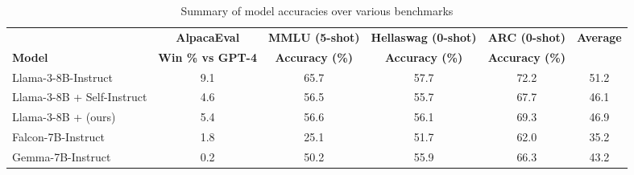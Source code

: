\begin{comment}
Instruciton이 add되면 S로 부터 삭제될 victim seed instruction을 정해야함.
Victim은 해당 seed instruciton이 얼마나 diversity한 generated instruction을 생성했는지에
대한 값, score를 가지고 선정됨.
Score는 seed instruction score table에서 유지되며, 해당 table은 seed instruction이 key로써 작동함.
해당 table의 seed instruction은 seed가 add되면 추가되고, evict되면 table에서 삭제됨.
Score는 다음과 같은 방식으로 매겨짐. 그림 6은 매겨지는 예시를 보여줌.
instruction을 생성할 때, Algorithm 1의 line 1과 같은 방식으로 S'가 선택됨.
예를 들어 seeda, seedb, seedc가 선택되었다고 하자.
이 세 seed instruction을 통해 generation instruction G가 produce됨.
예시에선 14개의 generated instruction이 생성됨.
이때 line 3-13에 의해 filtering이 수행됨. 즉 몇개의 generated instructions가 filtering됨
그림에서는 3개의 generated instruction이 discard되고, 11개의 instruction이 kept됨
한번의 generation 사이클이 모두 끝나고 나면, seed instruction score table을 업데이트 함.
table에서 해당 사이클에 참여한 seeda, seedb, seedc에 대한 seedgen에는 해당
사이클에서 생성된 generated instruction의 수, 14를 더해줌
그리고 seedkept에는 해당 사이클에서 필터링을 통과한 kept instruction의 수 11을 더해줌
해당 값들은 매 사이클마다 누적됨. 다음 사이클에서 seedn, seedm, seedl이 선택되어 instruction generation 과정에 참여했다면
해당 seed instruction의 seedgen, seedkept가 업데이트 될 것임.
마지막으로 score를 업데이트 하는데, score는 seedkept/seedgen으로 계산됨
\end{comment}

\begin{table*}[t]
\caption{Summary of model accuracies over various benchmarks}
\label{tab:benchmarks}
\footnotesize
\centering
\begin{tabular}{l|cccc|c}
                            & \textbf{AlpacaEval}      & \textbf{MMLU (5-shot)} & \textbf{Hellaswag (0-shot)} & \textbf{ARC (0-shot)}   & \textbf{Average} \\ \cline{2-6} 
\textbf{Model}              & \textbf{Win \% vs GPT-4} & \textbf{Accuracy (\%)} & \textbf{Accuracy (\%)}      & \textbf{Accuracy (\%)}  & \textbf{}        \\ \thickhline
Llama-3-8B-Instruct         & 9.1                      & 65.7                   & 57.7                        & 72.2                    & 51.2             \\
Llama-3-8B + Self-Instruct  & 4.6                      & 56.5                   & 55.7                        & 67.7                    & 46.1             \\
\rowcolor[HTML]{DFDFDF} 
Llama-3-8B + \ours{} (ours) & 5.4                      & 56.6                   & 56.1                        & 69.3                    & 46.9             \\
Falcon-7B-Instruct          & 1.8                      & 25.1                   & 51.7                        & 62.0                    & 35.2             \\
Gemma-7B-Instruct           & 0.2                      & 50.2                   & 55.9                        & 66.3                    & 43.2             
\end{tabular}
\end{table*}


